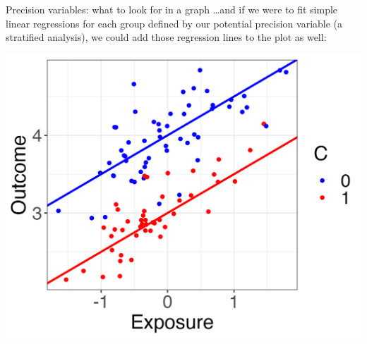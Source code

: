 \documentclass[10pt,t]{beamer}
\begin{document}
\begin{frame}{Precision variables: what to look for in a graph}
\dots and if we were to fit simple linear regressions for each group defined by our potential precision variable (a stratified analysis), we could add those regression lines to the plot as well:

\vspace{0.3cm}

\centering \includegraphics[scale=0.4]{p7.png}

\end{frame}
\end{document}
